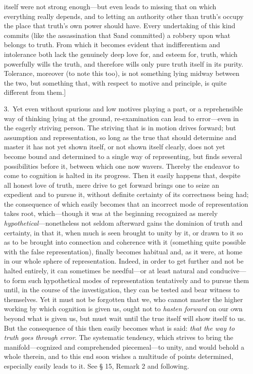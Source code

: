 \documentclass[12pt,a4paper]{book}
\begin{document}
itself were not strong enough---but even leads to missing that on which everything really depends,
and to letting an authority other than truth's occupy the place that truth's own power should have.
Every undertaking of this kind commits (like the assassination that Sand committed) a robbery upon
what belongs to truth. From which it becomes evident that indifferentism and intolerance both lack
the genuinely deep love for, and esteem for, truth, which powerfully wills the truth, and therefore
wills only pure truth itself in its purity. Tolerance, moreover (to note this too), is not something
lying midway between the two, but something that, with respect to motive and principle, is quite
different from them.]

3.~Yet even without spurious and low motives playing a part, or a reprehensible way of thinking lying at
the ground, re-examination can lead to error---even in the eagerly striving person. The striving
that is in motion drives forward; but assumption and representation, so long as the true that should
determine and master it has not yet shown itself, or not shown itself clearly, does not yet become
bound and determined to a single way of representing, but finds several possibilities before it,
between which one now wavers. Thereby the endeavor to come to cognition is halted in its progress.
Then it easily happens that, despite all honest love of truth, mere drive to get forward brings one
to seize an expedient and to pursue it, without definite certainty of its correctness being had; the
consequence of which easily becomes that an incorrect mode of representation takes root, which---though
it was at the beginning recognized as merely \emph{hypothetical}---nonetheless not seldom afterward
gains the dominion of truth and certainty, in that it, when much is seen brought to unity by it, or
drawn to it so as to be brought into connection and coherence with it (something quite possible with
the false representation), finally becomes habitual and, as it were, at home in our whole sphere of
representation. Indeed, in order to get further and not be halted entirely, it can sometimes be
needful---or at least natural and conducive---to form such hypothetical modes of representation
tentatively and to pursue them until, in the course of the investigation, they can be tested and
bear witness to themselves. Yet it must not be forgotten that we, who cannot master the higher
working by which cognition is given us, ought not to \emph{hasten forward} on our own beyond what is
given us, but must wait until the true itself will show itself to us. But the consequence of this
then easily becomes what is said: \emph{that the way to truth goes through error}. The systematic
tendency, which strives to bring the manifold---cognized and comprehended piecemeal---to unity, and
would behold a whole therein, and to this end soon wishes a multitude of points determined,
especially easily leads to it. See § 15, Remark 2 and following.
\end{document}
